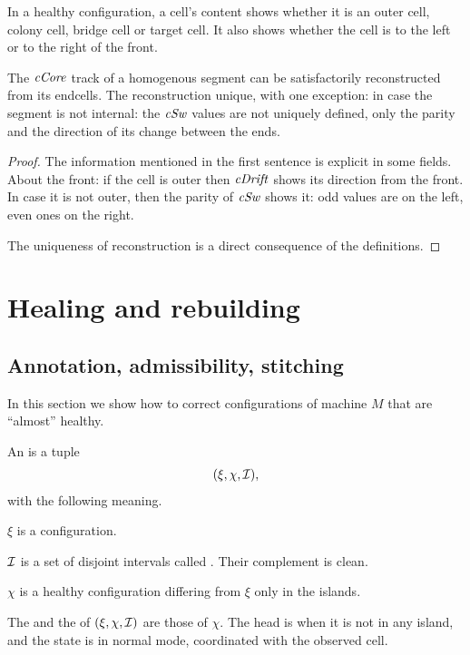 \documentclass[12pt]{memoir}
\newcommand{\fld}[1]{\ensuremath{\textit{#1\/}}}
\newcommand{\cCore}{\fld{cCore}}
\newcommand{\cDrift}{\fld{cDrift}}
\newcommand{\cSweep}{\fld{cSw}}
\begin{document}
\begin{lemma}\label{lem:infer-between}
In a healthy configuration, 
a cell's content shows whether it is an outer cell, colony cell, bridge cell or target cell.
It also shows whether the cell is to the left or to the right of the front.

The \( \cCore \) track of a homogenous segment can be satisfactorily reconstructed
from its endcells.
The reconstruction unique, with one exception: in case the segment is not internal: the
\( \cSweep \) values are not uniquely defined, only the parity and the direction of its 
change between the ends.
\end{lemma}
\begin{proof}
The information mentioned in the first sentence is explicit in some fields.
About the front: if the cell is outer then \( \cDrift \) shows its direction from the front.
In case it is not outer, then the parity of \( \cSweep \) shows it: odd values are on the left, even 
ones on the right. 

The uniqueness of reconstruction is a direct consequence of the definitions.
\end{proof}

\section{Healing and rebuilding}\label{sec:healing}

\subsection{Annotation, admissibility, stitching}\label{sec:stitching}

In this section we show how to correct configurations of machine \( M \)
that are ``almost'' healthy.

\begin{definition}[Annotation]\label{def:annotation}
  An  is a tuple
  \begin{align*}
    (\xi,\chi, \mathcal{I}),
  \end{align*}
  with the following meaning.

  \( \xi \) is a configuration.

  \( \mathcal{I} \) is a set of disjoint intervals called .
Their complement is clean.

  \( \chi \) is a healthy configuration differing from \( \xi \) only in the islands.

The  and the  of \( (\xi,\chi, \mathcal{I}) \) are those of \( \chi \).
The head is  when it is not in any island,
and the state is in normal mode, coordinated with the observed cell.
  \end{definition}
\end{document}
